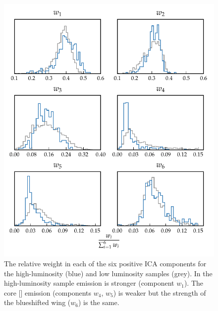 \begin{figure}
    \includegraphics[width=\textwidth]{figures/chapter04/mfica_component_weights.pdf} 
    \caption{The relative weight in each of the six positive \ac{ICA} components for the high-luminosity (blue) and low luminosity samples (grey). In the high-luminosity sample  emission is stronger (component $w_1$). The core [] emission (components $w_4$, $w_5$) is weaker but the strength of the blueshifted wing ($w_6$) is the same.}     
    \label{fig:mfica_component_weights}
\end{figure}

